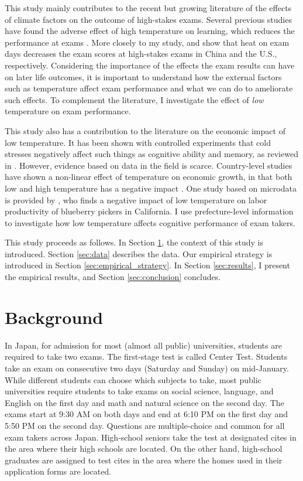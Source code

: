 \documentclass[12pt,letterpaper]{article}
\begin{document}
This study mainly contributes to the recent but growing literature of the effects of climate factors on the outcome of high-stakes exams.
Several previous studies have found the adverse effect of high temperature on learning, which reduces the performance at exams \citep{Park2020b, Cho2017}.
More closely to my study, \citet{GraffZivin2020} and \citet{Park2020a} show that heat on exam days decreases the exam scores at high-stakes exams in China and the U.S., respectively.
Considering the importance of the effects the exam results can have on later life outcomes, it is important to understand how the external factors such as temperature affect exam performance and what we can do to ameliorate such effects.
To complement the literature, I investigate the effect of \textit{low} temperature on exam performance.

This study also has a contribution to the literature on the economic impact of low temperature.
It has been shown with controlled experiments that cold stresses negatively affect such things as cognitive ability and memory, as reviewed in \citet{Taylor2016}.
However, evidence based on data in the field is scarce.
Country-level studies have shown a non-linear effect of temperature on economic growth, in that both low and high temperature has a negative impact \citep{Burke2015}.
One study based on microdata is provided by \citet{Stevens2017}, who finds a negative impact of low temperature on labor productivity of blueberry pickers in California.
I use prefecture-level information to investigate how low temperature affects cognitive performance of exam takers.

This study proceeds as follows.
In Section \ref{sec:background}, the context of this study is introduced.
Section \ref{sec:data} describes the data. 
Our empirical strategy is introduced in Section \ref{sec:empirical_strategy}.
In Section \ref{sec:results}, I present the empirical results, and Section \ref{sec:conclusion} concludes.
  
\section{Background}\label{sec:background}

In Japan, for admission for most (almost all public) universities, students are required to take two exams.
The first-stage test is called Center Test.
Students take an exam on consecutive two days (Saturday and Sunday) on mid-January.
While different students can choose which subjects to take, most public universities require students to take exams on social science, language, and English on the first day and math and natural science on the second day.
The exams start at 9:30 AM on both days and end at 6:10 PM on the first day and 5:50 PM on the second day.
Questions are multiple-choice and common for all exam takers across Japan.
High-school seniors take the test at designated cites in the area where their high schools are located.
On the other hand, high-school graduates are assigned to test cites in the area where the homes used in their application forms are located.
\end{document}

